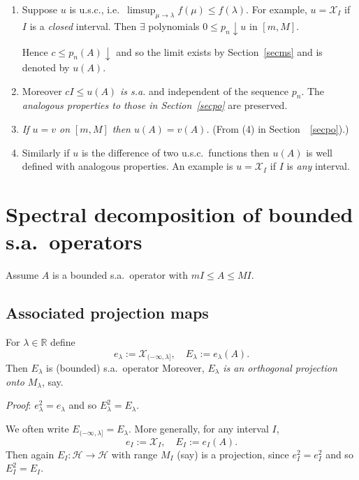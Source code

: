 \documentclass[a4paper]{amsart}
\theoremstyle{plain}
\theoremstyle{definition}
\theoremstyle{remark}
\begin{document}
\begin{enumerate}

\item Suppose $ u $ is u.s.c., i.e.\  $ \limsup_{\mu\to \lambda} f(\mu) \leq f(\lambda) $.
For example, $ u =  \mathcal{X}_I $ if $ I $ is a \emph{closed} interval.
Then $ \exists $ polynomials $ 0 \leq p_n \downarrow u $  in $ [m,M] $.

Hence $ c \leq p_n(A) \downarrow $ and so the  limit exists  by Section~\ref{secms}  and is denoted by $ u(A) $.

\item Moreover $ cI \leq u(A) $ \emph{is s.a.} and independent of the sequence $ p_n $.  The \emph{analogous properties to those in Section~\ref{secpo}} are preserved.

\item    \emph{If $ u=v $ on $ [m,M]$ then $ u(A) = v(A) $.} (From (4) in Section~~\ref{secpo}).)

\item Similarly if $ u $ is the difference of two  u.s.c.\  functions then $ u(A) $ is well defined with analogous properties.  An example is $ u =  \mathcal{X}_I $ if $ I $ is   \emph{any} interval.



\end{enumerate} 



\section{\textbf{Spectral decomposition of bounded s.a.\ operators}}
Assume $ A $ is a bounded s.a.\ operator with $ mI \leq A \leq MI $.

\subsection{Associated projection maps}  For $ \lambda \in \mathbb{R} $ define 
\[
 e_\lambda  := \mathcal{X}_{(-\infty, \lambda ] },   \quad   E_ \lambda  := e_\lambda(A). 
  \]
Then $ E_\lambda $ is (bounded) s.a.\  operator 
Moreover, \emph{$ E_\lambda $ is an orthogonal projection onto $ M_\lambda $}, say.

\emph{Proof}: $ e_\lambda^2 = e_\lambda  $    and so $ E_\lambda^2 = E_ \lambda $. 

\medskip  We often write $ E_{(-\infty, \lambda]} = E_\lambda$.
More generally, for any interval $ I $, 
\[
e_I := \mathcal{X}_I, \quad  E_I := e_I(A) .
\]
Then again $ E_I : \mathcal{H} \to \mathcal{H} $ with range $ M_I $ (say) is a projection, since $ e_I^2 = e_I^2 $ and so $ E_I^2 = E_I $.
\end{document}
